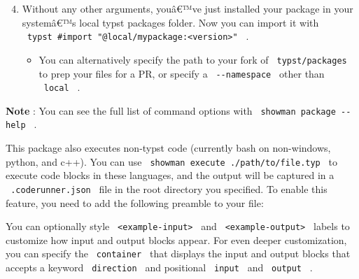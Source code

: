 \begin{Shaded}
\begin{Highlighting}[]
\end{Highlighting}
\end{Shaded}

\begin{enumerate}
\setcounter{enumi}{3}
\item
  Without any other arguments, youâ€™ve just installed your package in
  your systemâ€™s local typst packages folder. Now you can import it
  with
  \texttt{\ typst\ \#import\ "@local/mypackage:\textless{}version\textgreater{}"\ }
  .

  \begin{itemize}
  \tightlist
  \item
    You can alternatively specify the path to your fork of
    \texttt{\ typst/packages\ } to prep your files for a PR, or specify
    a \texttt{\ -\/-namespace\ } other than \texttt{\ local\ } .
  \end{itemize}
\end{enumerate}

\textbf{Note} : You can see the full list of command options with
\texttt{\ showman\ package\ -\/-help\ } .

This package also executes non-typst code (currently bash on
non-windows, python, and c++). You can use
\texttt{\ showman\ execute\ ./path/to/file.typ\ } to execute code blocks
in these languages, and the output will be captured in a
\texttt{\ .coderunner.json\ } file in the root directory you specified.
To enable this feature, you need to add the following preamble to your
file:

\begin{Shaded}
\begin{Highlighting}[]


\end{Highlighting}
\end{Shaded}

You can optionally style
\texttt{\ \textless{}example-input\textgreater{}\ } and
\texttt{\ \textless{}example-output\textgreater{}\ } labels to customize
how input and output blocks appear. For even deeper customization, you
can specify the \texttt{\ container\ } that displays the input and
output blocks that accepts a keyword \texttt{\ direction\ } and
positional \texttt{\ input\ } and \texttt{\ output\ } .

